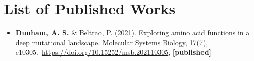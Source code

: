 \chapter{List of Published Works}


\begin{itemize}
	\small
	\item[] \textbf{Dunham, A. S.} \& Beltrao, P. (2021). Exploring amino acid functions in a deep mutational landscape. Molecular Systems Biology, 17(7), e10305.\ \url{https://doi.org/10.15252/msb.202110305}, \textbf{[published]} 
\end{itemize}
